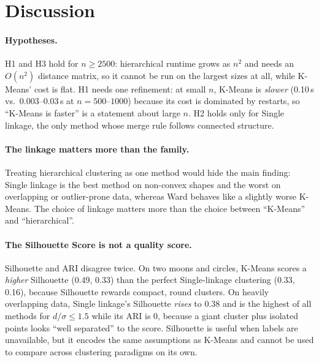 \documentclass[11pt,letterpaper]{article}
\begin{document}
\section{Discussion}
\label{sec:discussion}

\paragraph{Hypotheses.} H1 and H3 hold for $n\geq 2500$: hierarchical
runtime grows as $n^2$ and needs an $O(n^2)$ distance matrix, so it cannot be
run on the largest sizes at all, while K-Means' cost is flat. H1 needs one
refinement: at small $n$, K-Means is \emph{slower} (0.10\,s vs.\ 0.003--0.03\,s
at $n=500$--$1000$) because its cost is dominated by restarts, so
``K-Means is faster'' is a statement about large $n$. H2 holds only for
Single linkage, the only method whose merge rule follows connected structure.

\paragraph{The linkage matters more than the family.} Treating
hierarchical clustering as one method would hide the main finding:
Single linkage is the best method on non-convex shapes and the worst on
overlapping or outlier-prone data, whereas Ward behaves like a slightly worse
K-Means. The choice of linkage matters more than the choice between
``K-Means'' and ``hierarchical''.

\paragraph{The Silhouette Score is not a quality score.} Silhouette and ARI
disagree twice. On two moons and circles, K-Means scores a \emph{higher}
Silhouette (0.49, 0.33) than the perfect Single-linkage clustering (0.33,
0.16), because Silhouette rewards compact, round clusters. On heavily
overlapping data, Single linkage's Silhouette \emph{rises} to 0.38 and is
the highest of all methods for $d/\sigma\le1.5$ while its ARI is 0, because a giant cluster plus
isolated points looks ``well separated'' to the score. Silhouette is useful
when labels are unavailable, but it encodes the same assumptions as K-Means
and cannot be used to compare across clustering paradigms on its own.
\end{document}
